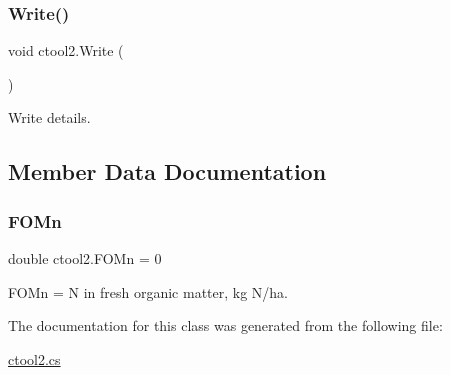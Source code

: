 \subsubsection{\texorpdfstring{Write()}{Write()}}
{\footnotesize\ttfamily void ctool2.\+Write (\begin{DoxyParamCaption}{ }\end{DoxyParamCaption})\hspace{0.3cm}{\ttfamily [inline]}}



Write details. 



\subsection{Member Data Documentation}
\mbox{\label{classctool2_a2a658e8bff396aa74f6ce46404bd7121}} 
\subsubsection{\texorpdfstring{FOMn}{FOMn}}
{\footnotesize\ttfamily double ctool2.\+F\+O\+Mn = 0}



F\+O\+Mn = N in fresh organic matter, kg N/ha. 



The documentation for this class was generated from the following file\+:\begin{DoxyCompactItemize}
\item 
\mbox{\hyperlink{ctool2_8cs}{ctool2.\+cs}}\end{DoxyCompactItemize}
